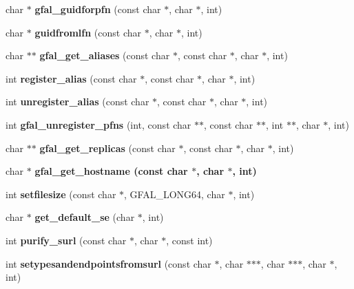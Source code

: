 \begin{CompactItemize}
\item 
char $\ast$ \textbf{gfal\_\-guidforpfn} (const char $\ast$, char $\ast$, int)\label{group__internal__group_g86568afb8c7f9b0d6944de793a3e867a}

\item 
char $\ast$ \textbf{guidfromlfn} (const char $\ast$, char $\ast$, int)\label{group__internal__group_g47c91fab6a02d32fcc1c6d6a53ba2ce3}

\item 
char $\ast$$\ast$ \textbf{gfal\_\-get\_\-aliases} (const char $\ast$, const char $\ast$, char $\ast$, int)\label{group__internal__group_g25d4ae6bef6570590efbc8548e7d79e2}

\item 
int \textbf{register\_\-alias} (const char $\ast$, const char $\ast$, char $\ast$, int)\label{group__internal__group_g8a3be4d56dcedebe98cf84e8d5082782}

\item 
int \textbf{unregister\_\-alias} (const char $\ast$, const char $\ast$, char $\ast$, int)\label{group__internal__group_g2483d66384257fdbe3b1fd6c568709b8}

\item 
int \textbf{gfal\_\-unregister\_\-pfns} (int, const char $\ast$$\ast$, const char $\ast$$\ast$, int $\ast$$\ast$, char $\ast$, int)\label{group__internal__group_g70f889fa2436723fb7b3cff20b661f21}

\item 
char $\ast$$\ast$ \textbf{gfal\_\-get\_\-replicas} (const char $\ast$, const char $\ast$, char $\ast$, int)\label{group__internal__group_gbd0a581309f65e07a5e28d442f07b169}

\item 
char $\ast$ \bf{gfal\_\-get\_\-hostname} (const char $\ast$, char $\ast$, int)
\item 
int \textbf{setfilesize} (const char $\ast$, GFAL\_\-LONG64, char $\ast$, int)\label{group__internal__group_g55aa4c3600970faa6cad13673d88261f}

\item 
char $\ast$ \textbf{get\_\-default\_\-se} (char $\ast$, int)\label{group__internal__group_gc304a754c49bedeec6c1c9b1445b937d}

\item 
int \textbf{purify\_\-surl} (const char $\ast$, char $\ast$, const int)\label{group__internal__group_gc25d6ed82e636c14d640318a2ad5f3b5}

\item 
int \textbf{setypesandendpointsfromsurl} (const char $\ast$, char $\ast$$\ast$$\ast$, char $\ast$$\ast$$\ast$, char $\ast$, int)\label{group__internal__group_gf398c539d03eaea6dcb6b45067cb21f2}


\end{CompactItemize}
